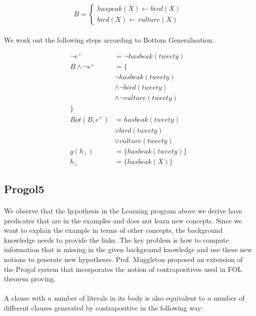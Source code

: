 \documentclass{article}
\theoremstyle{plain}
\theoremstyle{definition}
\begin{document}
\begin{multicols}{2}
\[
B = \begin{cases}
haspeak(X) \leftarrow bird(X)\\
bird(X) \leftarrow vulture(X)
\end{cases}
\]

\paragraph{} We work out the following steps according to Bottom Generalisation:

\begin{align*}
\lnot e^+ &= \lnot hasbeak(tweety)\\
B \land \lnot e^+ &= \{\\
& \lnot hasbeak(tweety)\\
& \land \lnot bird(tweety) \\
& \land \lnot vulture(tweety)\\
\}&\\
Bot(B, e^+) &= hasbeak(tweety)\\
& \lor bird(tweety)\\
& \lor vulture(tweety)\\
g(h_{\perp}) &= \{ hasbeak(tweety) \}\\
h_{\perp} &= \{ hasbeak(X) \}
\end{align*}

\subsection{Progol5}

\paragraph{} We observe that the hypothesis in the Learning program above we derive have predicates that are in the examples and does not learn new concepts. Since we want to explain the example in terms of other concepts, the background knowledge needs to provide the links. The key problem is how to compute information that is missing in the given background knowledge and use these new notions to generate new hypotheses. Prof. Muggleton proposed an extension of the Progol system that incorporates the notion of contrapositives used in FOL theorem proving\cite{muggleton00}.

\paragraph{} A clause with $n$ number of literals in its body is also equivalent to $n$ number of different clauses generated by contrapositive in the following way:


\end{multicols}
\end{document}

